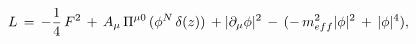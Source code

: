 \begin{equation}
\label{lagp}
L\, = \, - {1\over 4} \, F^2 \, + \, A_{\mu}\, \Pi^{\mu 0}\, (\phi^N
\, \delta(z)) \, + |\partial_{\mu}\phi|^2 \, - \, (- \,
m^2_{eff} |\phi|^2 \, + \, |\phi|^4),
\end{equation}

